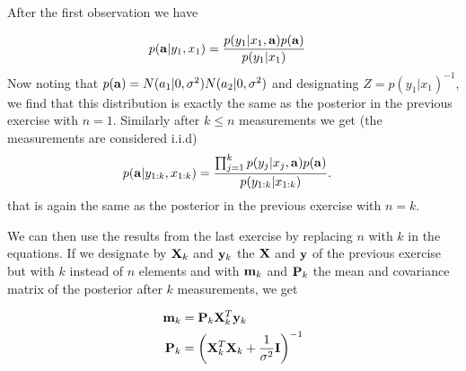 \documentclass[a4paper,oneside,article]{memoir}
\begin{document}
After the first observation we have

\begin{align}
	p(\mathbf{a}|y_1,x_1)&=\frac{p(y_1|x_1,\mathbf{a})p(\mathbf{a})}{p(y_1|x_1)}
\end{align}
Now noting that $p(\mathbf{a})=N(a_1|0,\sigma^2)N(a_2|0,\sigma^2)$ and designating $Z=p(y_1|x_1)^{-1}$, 
we find that this distribution is exactly the same as the posterior in the previous exercise with $n=1$.
Similarly after $k\leq n$ measurements we get (the measurements are considered i.i.d)
\begin{align}
	p(\mathbf{a}|y_{1:k},x_{1:k})&=\frac{\prod_{j=1}^k p(y_j|x_j,\mathbf{a})p(\mathbf{a})}{p(y_{1:k}|x_{1:k})}.
\end{align}
that is again the same as the posterior in the previous exercise with $n=k$.

We can then use the results from the last exercise by replacing $n$ with $k$ in the equations. If we designate by 
$\mathbf{X}_k$ and $\mathbf{y}_k$ the $\mathbf{X}$ and $\mathbf{y}$ of the previous exercise but with $k$ instead of $n$ elements and with $\mathbf{m}_k$ and 
$\mathbf{P}_k$ the mean and covariance matrix of the posterior after $k$ measurements,
we get

\begin{align}
	\mathbf{m}_k &= \mathbf{P}_k\mathbf{X}^T_k\mathbf{y}_k \label{eq:regression_batch_mean}\\
	\mathbf{P}_k&= \left(\mathbf{X}_k^T\mathbf{X}_k+\frac{1}{\sigma^2}\mathbf{I}\right)^{-1}\\
\end{align} 

\subsubsection{}
\end{document}
